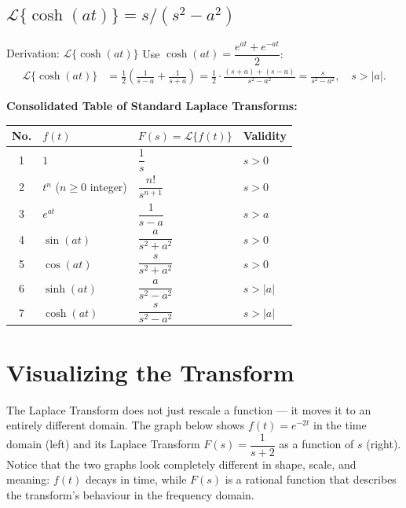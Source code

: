 \documentclass[12pt,a4paper]{article}
\begin{document}
\subsection{\texorpdfstring{$\mathcal{L}\{\cosh(at)\} = s/(s^2-a^2)$}{L{cosh(at)}}}

\begin{infobox}{Derivation: $\mathcal{L}\{\cosh(at)\}$}
Use $\cosh(at) = \dfrac{e^{at} + e^{-at}}{2}$:
\begin{align*}
\mathcal{L}\{\cosh(at)\}
  &= \frac{1}{2}\left(\frac{1}{s-a} + \frac{1}{s+a}\right)
   = \frac{1}{2}\cdot\frac{(s+a)+(s-a)}{s^2-a^2}
   = \frac{s}{s^2-a^2}, \quad s > |a|.
\end{align*}
\end{infobox}

\medskip

\noindent \textbf{Consolidated Table of Standard Laplace Transforms:}

\begin{center}
\begin{tabular}{@{}clll@{}}
\toprule
\textbf{No.} & \textbf{$f(t)$} & \textbf{$F(s) = \mathcal{L}\{f(t)\}$} & \textbf{Validity} \\
\midrule
1 & $1$           & $\dfrac{1}{s}$                & $s > 0$ \\[8pt]
2 & $t^n$ ($n \geq 0$ integer) & $\dfrac{n!}{s^{n+1}}$ & $s > 0$ \\[8pt]
3 & $e^{at}$      & $\dfrac{1}{s-a}$              & $s > a$ \\[8pt]
4 & $\sin(at)$    & $\dfrac{a}{s^2+a^2}$          & $s > 0$ \\[8pt]
5 & $\cos(at)$    & $\dfrac{s}{s^2+a^2}$          & $s > 0$ \\[8pt]
6 & $\sinh(at)$   & $\dfrac{a}{s^2-a^2}$          & $s > |a|$ \\[8pt]
7 & $\cosh(at)$   & $\dfrac{s}{s^2-a^2}$          & $s > |a|$ \\[8pt]
\bottomrule
\end{tabular}
\end{center}

\section{Visualizing the Transform}

The Laplace Transform does not just rescale a function --- it moves it to an entirely different domain. The graph below shows $f(t) = e^{-2t}$ in the time domain (left) and its Laplace Transform $F(s) = \dfrac{1}{s+2}$ as a function of $s$ (right). Notice that the two graphs look completely different in shape, scale, and meaning: $f(t)$ decays in time, while $F(s)$ is a rational function that describes the transform's behaviour in the frequency domain.
\end{document}
